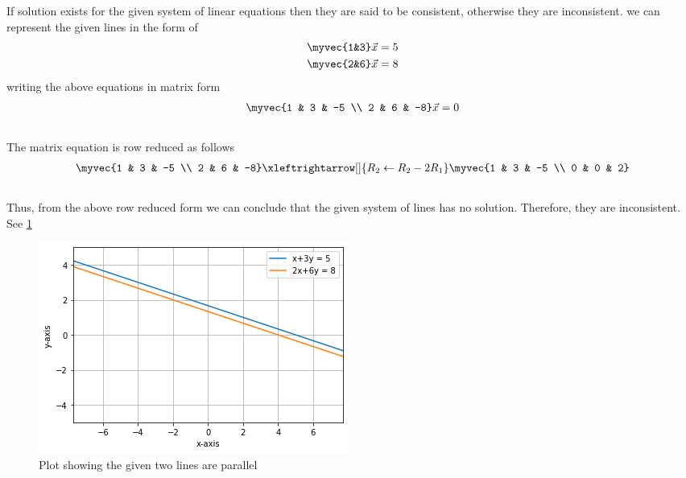 If solution exists for the given system of linear equations 
then they are said to be consistent, otherwise they are inconsistent. we can represent the given lines in the form of
\begin{align}
\myvec{1&3}\vec{x} = 5\\
\myvec{2&6}\vec{x} = 8
\end{align}
writing the above equations in matrix form
\begin{align}
\myvec{1 & 3 & -5 \\ 2 & 6 & -8}\vec{x} = 0
\end{align}\\
The matrix equation is row reduced as follows
\begin{align}
\myvec{1 & 3 & -5 \\ 2 & 6 & -8}  \xleftrightarrow[]{R_2\leftarrow R_2-2R_1} \myvec{1 & 3 & -5 \\ 0 & 0 & 2}
\end{align}\\
Thus, from the above row reduced form we can conclude that the given system of lines has no solution. Therefore, they are inconsistent.  See \ref{Fig 0:solutions/det/54/}
\begin{figure}
\centering
\includegraphics[width=\columnwidth]{./solutions/det/54/assignment2.png}
\caption{Plot showing the given two lines are parallel}
\label{Fig 0:solutions/det/54/}
\end{figure}
